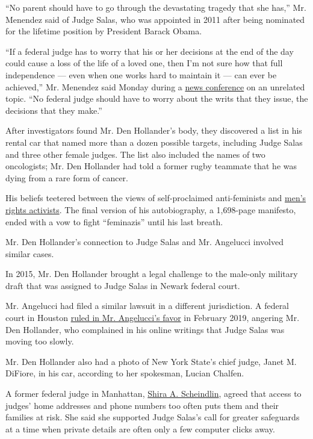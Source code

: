 ``No parent should have to go through the devastating tragedy that she
has,'' Mr. Menendez said of Judge Salas, who was appointed in 2011 after
being nominated for the lifetime position by President Barack Obama.

``If a federal judge has to worry that his or her decisions at the end
of the day could cause a loss of the life of a loved one, then I'm not
sure how that full independence --- even when one works hard to maintain
it --- can ever be achieved,'' Mr. Menendez said Monday during a
\href{https://www.facebook.com/senatormenendez/videos/721816791697781}{news
conference} on an unrelated topic. ``No federal judge should have to
worry about the writs that they issue, the decisions that they make.''

After investigators found Mr. Den Hollander's body, they discovered a
list in his rental car that named more than a dozen possible targets,
including Judge Salas and three other female judges. The list also
included the names of two oncologists; Mr. Den Hollander had told a
former rugby teammate that he was dying from a rare form of cancer.

His beliefs teetered between the views of self-proclaimed anti-feminists
and
\href{https://www.nytimes.com/2018/07/13/style/mens-rights-movement.html}{men's
rights activists}. The final version of his autobiography, a 1,698-page
manifesto, ended with a vow to fight ``feminazis'' until his last
breath.

Mr. Den Hollander's connection to Judge Salas and Mr. Angelucci involved
similar cases.

In 2015, Mr. Den Hollander brought a legal challenge to the male-only
military draft that was assigned to Judge Salas in Newark federal court.

Mr. Angelucci had filed a similar lawsuit in a different jurisdiction. A
federal court in Houston
\href{https://www.nytimes.com/2019/02/24/us/military-draft-men-unconstitutional.html}{ruled
in Mr. Angelucci's favor} in February 2019, angering Mr. Den Hollander,
who complained in his online writings that Judge Salas was moving too
slowly.

Mr. Den Hollander also had a photo of New York State's chief judge,
Janet M. DiFiore, in his car, according to her spokesman, Lucian
Chalfen.

A former federal judge in Manhattan,
\href{https://www.nytimes.com/2016/03/24/nyregion/shira-scheindlin-judge-behind-stop-and-frisk-ruling-will-step-down.html?searchResultPosition=2}{Shira
A. Scheindlin}, agreed that access to judges' home addresses and phone
numbers too often puts them and their families at risk. She said she
supported Judge Salas's call for greater safeguards at a time when
private details are often only a few computer clicks away.

